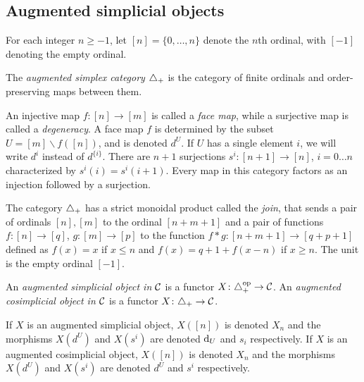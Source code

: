 \subsection{Augmented simplicial objects}\label{s:simplices}

For each integer $n \geq -1$, let $[n] = \{0,\dots,n\}$ denote the $n$th ordinal, with $[-1]$ denoting the empty ordinal.

\begin{definition}
	The \emph{augmented simplex category} $\triangle_{+}$ is the category of finite ordinals and order-preserving maps between them. %
\end{definition}

An injective map $f \colon [n] \to [m]$ is called a \emph{face map}, while a surjective map is called a \emph{degeneracy}. A face map $f$ is determined by the subset $U = [m]\smallsetminus f([n])$, and is denoted $d^U$. If $U$ has a single element $i$, we will write $d^i$ instead of $d^{\{i\}}$. There are $n+1$ surjections $s^i \colon [n+1] \to [n]$, $i = 0\dots n$ characterized by $s^i(i) = s^i(i+1)$. Every map in this category factors as an injection followed by a surjection.

The category $\triangle_{+}$ has a strict monoidal product called the \emph{join}, that sends a pair of ordinals $[n],[m]$ to the ordinal $[n+m+1]$ and a pair of functions $f \colon [n] \to [q]$, $g \colon [m] \to [p]$ to the function $f*g \colon [n+m+1] \to [q+p+1]$ defined as $f(x) = x$ if $x\leq n$ and $f(x) = q+1+f(x-n)$ if $x \geq n$. The unit is the empty ordinal $[-1]$.

\begin{definition}
	An \emph{augmented simplicial object in $\mathcal{C}$} is a functor $X \colon \triangle_{+}^\mathrm{op} \to \mathcal{C}$.
	An \emph{augmented cosimplicial object in $\mathcal{C}$} is a functor $X \colon \triangle_{+} \to \mathcal{C}$.
\end{definition}

If $X$ is an augmented simplicial object, $X([n])$ is denoted $X_n$ and the morphisms $X(d^U)$ and $X(s^i)$ are denoted $\operatorname{d}_U$ and $s_i$ respectively. If $X$ is an augmented cosimplicial object, $X([n])$ is denoted $X_n$ and the morphisms $X(d^U)$ and $X(s^i)$ are denoted $d^U$ and $s^i$ respectively.

